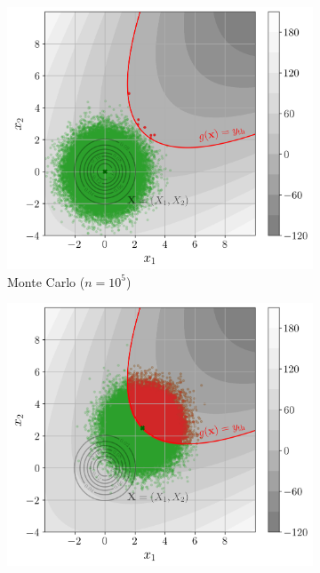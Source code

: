 

\begin{figure}[ht]
    \centering
    \begin{subfigure}[b]{0.32\textwidth}
        \centering
        \includegraphics[width=\textwidth]{../numerical_experiments/chapter1/figures/reliability_MC_illustration.png}
        \caption{Monte Carlo ($n=10^5$)}
    \end{subfigure}
    \hfill
    \begin{subfigure}[b]{0.32\textwidth}
        \centering
        \includegraphics[width=\textwidth]{../numerical_experiments/chapter1/figures/reliability_IS_illustration.png}

\end{subfigure}
\end{figure}
